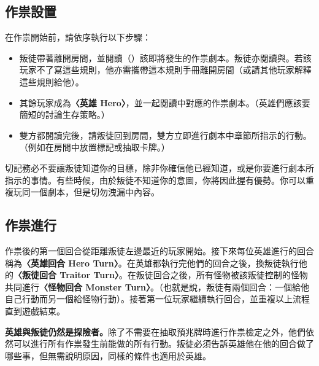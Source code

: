
\subsection{作祟設置} \label{ssec:haunt-setup}

在作祟開始前，請依序執行以下步驟：

\begin{itemize}
	\item 叛徒帶著離開房間，並閱讀（）該即將發生的作祟劇本。叛徒亦閱讀與。若該玩家不了寫這些規則，他亦需攜帶這本規則手冊離開房間（或請其他玩家解釋這些規則給他）。
	\item 其餘玩家成為\textbf{〈英雄 Hero〉}，並一起閱讀中對應的作祟劇本。（英雄們應該要簡短的討論生存策略。）
	\item 雙方都閱讀完後，請叛徒回到房間，雙方立即進行劇本中章節所指示的行動。（例如在房間中放置標記或抽取卡牌。）
\end{itemize}

\begin{RuleBox}{}
	切記務必不要讓叛徒知道你的目標，除非你確信他已經知道，或是你要進行劇本所指示的事情。有些時候，由於叛徒不知道你的意圖，你將因此握有優勢。你可以重複玩同一個劇本，但是切勿洩漏中內容。
\end{RuleBox}


\subsection{作祟進行} \label{ssec:playing-the-hanut}

作祟後的第一個回合從距離叛徒左邊最近的玩家開始。接下來每位英雄進行的回合稱為\textbf{〈英雄回合 Hero Turn〉}。在英雄都執行完他們的回合之後，換叛徒執行他的\textbf{〈叛徒回合 Traitor Turn〉}。在叛徒回合之後，所有怪物被該叛徒控制的怪物共同進行\textbf{〈怪物回合 Monster Turn〉}。（也就是說，叛徒有兩個回合：一個給他自己行動而另一個給怪物行動）。接著第一位玩家繼續執行回合，並重複以上流程直到遊戲結束。

\textbf{英雄與叛徒仍然是探險者。}除了不需要在抽取預兆牌時進行作祟檢定之外，他們依然可以進行所有作祟發生前能做的所有行動。叛徒必須告訴英雄他在他的回合做了哪些事，但無需說明原因，同樣的條件也適用於英雄。

